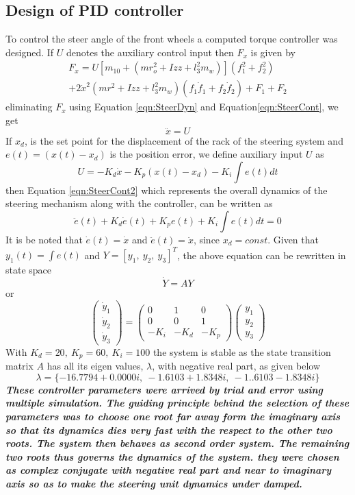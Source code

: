 {\subsection{Design of PID controller}
To control the steer angle of the front wheels a computed torque controller \cite{craig2005introduction} was designed. If $U$ denotes the auxiliary control input then $F_x$ is given by
\begin{multline}
\label{eqn:SteerCont}
F_x=U\left[ m_{10}+\left(mr_o^2+I{zz}+l^2_3m_w \right) \right] \left( f_1^2+f_2^2 \right)\\
+2\dot x^2 \left(mr^2+I{zz}+l_3^2 m_w \right) \left( f_1 \dot f_1 +f_2 \dot f_2\right) 
+F_1+F_2
\end{multline}
eliminating  $F_x$ using Equation \ref{eqn:SteerDyn} and Equation\ref{eqn:SteerCont}, we get
\begin{equation}
\label{eqn:SteerCont2}
\ddot x =U
\end{equation}
If $x_d$, is the set point for the displacement of the rack of the steering system and $e(t)=(x(t)-x_d)$ is the position error, we define auxiliary input $U$ as  
\begin{equation}
\label{eqn:SteerCont3}
 U=-K_d \dot x -K_p \left(x(t)-x_d \right) -K_i\int e(t)dt \end{equation}
then Equation \ref{eqn:SteerCont2} which represents the overall dynamics of the steering mechanism along with the controller, can  be written as 
\[\ddot e(t) +K_d \dot{e}(t) +K_p e(t)+ K_i\int e(t)dt=0 \]
It is be noted that $\dot e(t)=\dot x$ and $\ddot e(t)=\ddot x$, since $x_d=const$. Given that  $y_1(t)= \int e(t)$ and $Y=[y_1,~y_2,~y_3]^T$, the above equation can be rewritten in state space \[\dot{Y}=AY\] or
\begin{equation}
\begin{pmatrix}
\dot y_1 \\ \dot y_2 \\\dot y_3
\end{pmatrix}
=
\begin{pmatrix}
0 & 1 & 0\\ 0 & 0 & 1\\ -K_i & -K_d & -K_p
\end{pmatrix}
\begin{pmatrix}
 y_1 \\ y_2 \\ y_3
\end{pmatrix}
\end{equation}
With $K_d=20,~K_p=60,~K_i=100 $ the system is stable as  the state transition matrix $A$ has all its eigen values, $\lambda$, with negative real part, as given below 
\[ \lambda= \{-16.7794 + 0.0000i, ~ -1.6103 + 1.8348i, ~ -1..6103 - 1.8348i\}\]
 \textbf{\textit{These controller parameters were arrived by trial and error using multiple simulation. The guiding principle behind the selection of these parameters was to choose one root far away form the imaginary axis so that its dynamics dies very fast with the respect to  the other two roots.  The system then behaves as second order system. The remaining two roots thus governs the dynamics of the system.  they were chosen as complex conjugate with negative real part and near to imaginary axis so as to make the steering unit dynamics  under damped.}}

}
